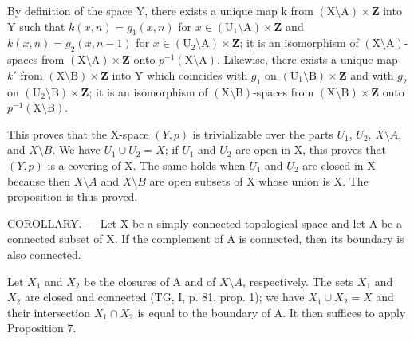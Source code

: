 By definition of the space Y, there exists a unique map k from \((\mathrm{X}\setminus\mathrm{A})\times\mathbf{Z}\) into Y such that \(k(x,n)=g_{1}(x,n)\) for \(x\in(\mathrm{U}_{1}\setminus\mathrm{A})\times\mathbf{Z}\) and \(k(x,n)=g_{2}(x,n-1)\) for \(x\in(\mathrm{U}_{2}\setminus\mathrm{A})\times\mathbf{Z}\); it is an isomorphism of \((\mathrm{X}\setminus\mathrm{A})\)-spaces from \((\mathrm{X}\setminus\mathrm{A})\times\mathbf{Z}\) onto \(p^{-1}(\mathrm{X}\setminus\mathrm{A})\). Likewise, there exists a unique map \(k'\) from \((\mathrm{X}\setminus\mathrm{B})\times\mathbf{Z}\) into Y which coincides with \(g_{1}\) on \((\mathrm{U}_{1}\setminus\mathrm{B})\times\mathbf{Z}\) and with \(g_{2}\) on \((\mathrm{U}_{2}\setminus\mathrm{B})\times\mathbf{Z}\); it is an isomorphism of \((\mathrm{X}\setminus\mathrm{B})\)-spaces from \((\mathrm{X}\setminus\mathrm{B})\times\mathbf{Z}\) onto \(p^{-1}(\mathrm{X}\setminus\mathrm{B})\).

This proves that the X-space \((Y,p)\) is trivializable over the parts \(U_{1}\), \(U_{2}\), \(X\setminus A\), and \(X\setminus B\). We have \(U_{1} \cup U_{2} = X\); if \(U_{1}\) and \(U_{2}\) are open in X, this proves that \((Y,p)\) is a covering of X. The same holds when \(U_{1}\) and \(U_{2}\) are closed in X because then \(X\setminus A\) and \(X\setminus B\) are open subsets of X whose union is X. The proposition is thus proved.

COROLLARY. --- Let X be a simply connected topological space and let A be a connected subset of X. If the complement of A is connected, then its boundary is also connected.

Let \(X_{1}\) and \(X_{2}\) be the closures of A and of \(X\setminus A\), respectively. The sets \(X_{1}\) and \(X_{2}\) are closed and connected (TG, I, p. 81, prop. 1); we have \(X_{1} \cup X_{2} = X\) and their intersection \(X_{1} \cap X_{2}\) is equal to the boundary of A. It then suffices to apply Proposition 7.
\relax{}
